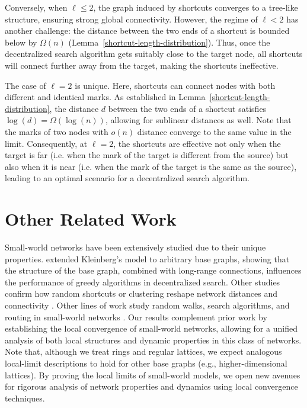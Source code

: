 \documentclass[10pt]{amsart}
\begin{document}
Conversely, when $\ell \leq 2$, the graph induced by shortcuts converges to a tree-like structure, ensuring strong global connectivity. However, the regime of $\ell < 2$ has another challenge: the distance between the two ends of a shortcut is bounded below by $\Omega(n)$ (Lemma~\ref{shortcut-length-distribution}). Thus, once the decentralized search algorithm gets suitably close to the target node, all shortcuts will connect further away from the target, making the shortcuts ineffective.

The case of $\ell = 2$ is unique. Here, shortcuts can connect nodes with both different and identical marks. As established in Lemma~\ref{shortcut-length-distribution}, the distance $d$ between the two ends of a shortcut satisfies $\log(d) = \Omega(\log(n))$,  allowing for sublinear distances as well. Note that the marks of two nodes with $o(n)$ distance converge to the same value in the limit. Consequently, at $\ell = 2$, the shortcuts are effective not only when the target is far (i.e. when the mark of the target is different from the source) but also when it is near (i.e. when the mark of the target is the same as the source), leading to an optimal scenario for a decentralized search algorithm. 

\section{Other Related Work}

Small-world networks have been extensively studied due to their unique properties. \cite{fraigniaud2010searchability,nguyen2005analyzing} extended Kleinberg’s model to arbitrary base graphs, showing that the structure of the base graph, combined with long-range connections, influences the performance of greedy algorithms in decentralized search. 
Other studies confirm how random shortcuts or clustering reshape network distances and connectivity \cite{benjamini2001diameter,bollobas2011sparse, coppersmith2002diameter}. 
Other lines of work study random walks, search algorithms, and routing in small-world networks \cite{dietzfelbinger2009tight, dyer2020random, fraigniaud2010searchability, giakkoupis2011optimal, mehrabian2016randomized, nguyen2005analyzing}. 
Our results complement prior work by establishing the local convergence of small-world networks, allowing for a unified analysis of both local structures and dynamic properties in this class of networks. Note that, although we treat rings and regular lattices, we expect analogous local-limit descriptions to hold for other base graphs (e.g., higher-dimensional lattices). By proving the local limits of small-world models, we open new avenues for rigorous analysis of network properties and dynamics using local convergence techniques.
\end{document}
